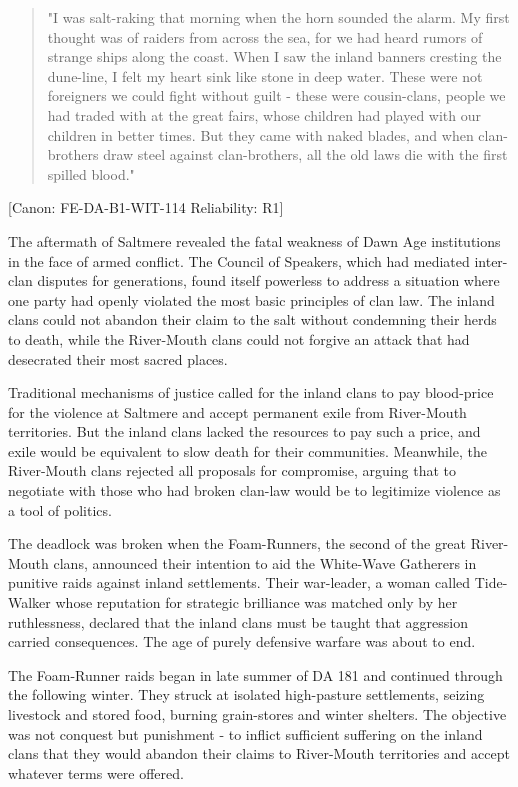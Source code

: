 \begin{quote}
"I was salt-raking that morning when the horn sounded the alarm. My
first thought was of raiders from across the sea, for we had heard
rumors of strange ships along the coast. When I saw the inland banners
cresting the dune-line, I felt my heart sink like stone in deep water.
These were not foreigners we could fight without guilt - these were
cousin-clans, people we had traded with at the great fairs, whose
children had played with our children in better times. But they came
with naked blades, and when clan-brothers draw steel against
clan-brothers, all the old laws die with the first spilled blood."
\end{quote}

{[}Canon: FE-DA-B1-WIT-114 \textbar{} Reliability: R1{]}

The aftermath of Saltmere revealed the fatal weakness of Dawn Age
institutions in the face of armed conflict. The Council of Speakers,
which had mediated inter-clan disputes for generations, found itself
powerless to address a situation where one party had openly violated the
most basic principles of clan law. The inland clans could not abandon
their claim to the salt without condemning their herds to death, while
the River-Mouth clans could not forgive an attack that had desecrated
their most sacred places.

Traditional mechanisms of justice called for the inland clans to pay
blood-price for the violence at Saltmere and accept permanent exile from
River-Mouth territories. But the inland clans lacked the resources to
pay such a price, and exile would be equivalent to slow death for their
communities. Meanwhile, the River-Mouth clans rejected all proposals for
compromise, arguing that to negotiate with those who had broken clan-law
would be to legitimize violence as a tool of politics.

The deadlock was broken when the Foam-Runners, the second of the great
River-Mouth clans, announced their intention to aid the White-Wave
Gatherers in punitive raids against inland settlements. Their
war-leader, a woman called Tide-Walker whose reputation for strategic
brilliance was matched only by her ruthlessness, declared that the
inland clans must be taught that aggression carried consequences. The
age of purely defensive warfare was about to end.

The Foam-Runner raids began in late summer of DA 181 and continued
through the following winter. They struck at isolated high-pasture
settlements, seizing livestock and stored food, burning grain-stores and
winter shelters. The objective was not conquest but punishment - to
inflict sufficient suffering on the inland clans that they would abandon
their claims to River-Mouth territories and accept whatever terms were
offered.

